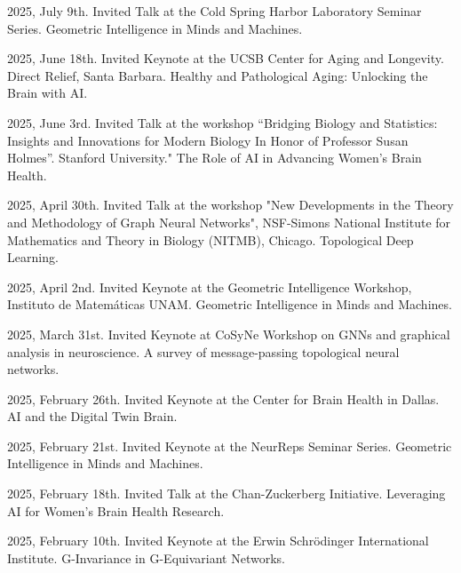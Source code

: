 2025, July 9th. Invited Talk at the Cold Spring Harbor Laboratory Seminar Series. Geometric Intelligence in Minds and Machines.

2025, June 18th. Invited Keynote at the UCSB Center for Aging and Longevity. Direct Relief, Santa Barbara. Healthy and Pathological Aging: Unlocking the Brain with AI.

2025, June 3rd. Invited Talk at the workshop “Bridging Biology and Statistics: Insights and Innovations for Modern Biology In Honor of Professor Susan Holmes”. Stanford University." The Role of AI in Advancing Women’s Brain Health.

2025, April 30th. Invited Talk at the workshop "New Developments in the Theory and Methodology of Graph Neural Networks", NSF-Simons National Institute for Mathematics and Theory in Biology (NITMB), Chicago. Topological Deep Learning.

2025, April 2nd. Invited Keynote at the Geometric Intelligence Workshop, Instituto de Matemáticas UNAM. Geometric Intelligence in Minds and Machines.

2025, March 31st. Invited Keynote at CoSyNe Workshop on GNNs and graphical analysis in neuroscience. A survey of message-passing topological neural networks.

2025, February 26th. Invited Keynote at the Center for Brain Health in Dallas. AI and the Digital Twin Brain.

2025, February 21st. Invited Keynote at the NeurReps Seminar Series. Geometric Intelligence in Minds and Machines.

2025, February 18th. Invited Talk at the Chan-Zuckerberg Initiative. Leveraging AI for Women’s Brain Health Research.

2025, February 10th. Invited Keynote at the Erwin Schrödinger International Institute. G-Invariance in G-Equivariant Networks.